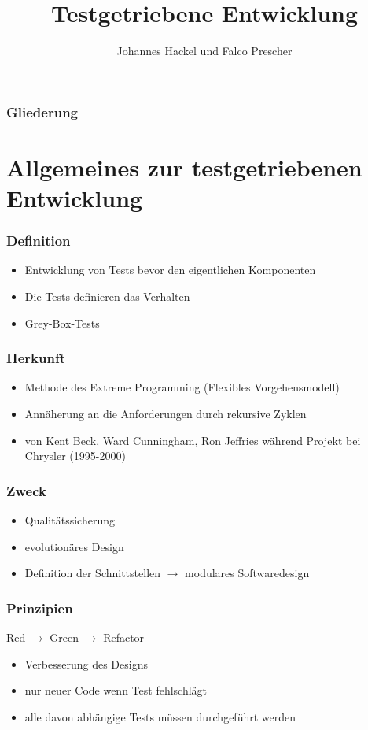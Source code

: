 \documentclass{beamer}
\author{Johannes Hackel und Falco Prescher}
\title{Testgetriebene Entwicklung}
\begin{document}
\begin{frame}
\titlepage
\end{frame}

\begin{frame}
\frametitle{Gliederung}
\tableofcontents
\end{frame}

\section{Allgemeines zur testgetriebenen Entwicklung}
\begin{frame}
\frametitle{Definition}
\begin{itemize}
\item Entwicklung von Tests bevor den eigentlichen Komponenten
\item Die Tests definieren das Verhalten
\item Grey-Box-Tests
\end{itemize}
\end{frame}

\begin{frame}
\frametitle{Herkunft}
\begin{itemize}
\item Methode des Extreme Programming (Flexibles Vorgehensmodell)
\item Annäherung an die Anforderungen durch rekursive Zyklen
\item von Kent Beck, Ward Cunningham, Ron Jeffries während Projekt bei Chrysler (1995-2000)
\end{itemize}
\end{frame}

\begin{frame}
\frametitle{Zweck}
\begin{itemize}
\item Qualitätssicherung
\item evolutionäres Design
\item Definition der Schnittstellen $\rightarrow$ modulares Softwaredesign
\end{itemize}
\end{frame}

\begin{frame}
\frametitle{Prinzipien}
\begin{center}
Red $\rightarrow$ Green $\rightarrow$ Refactor
\end{center}
\begin{itemize}
\item Verbesserung des Designs
\item nur neuer Code wenn Test fehlschlägt
\item alle davon abhängige Tests müssen durchgeführt werden
\end{itemize}
\end{frame}
\end{document}
